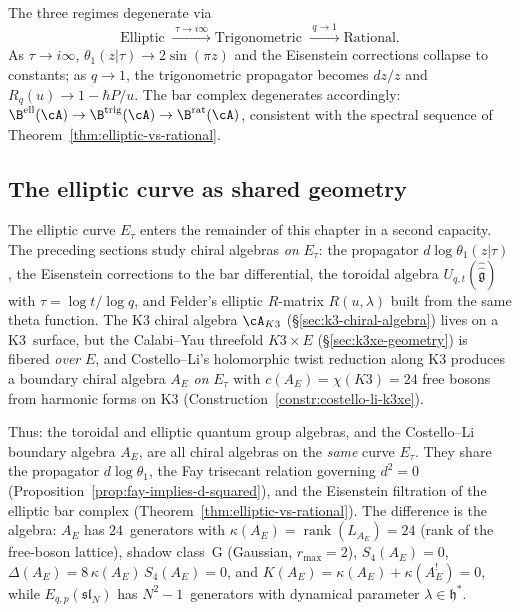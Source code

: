 \begin{remark}\label{rem:degeneration-limits}
The three regimes degenerate via
\begin{equation}\label{eq:degeneration-chain}
\text{Elliptic} \;\xrightarrow{\;\tau \to i\infty\;}
\text{Trigonometric} \;\xrightarrow{\;q \to 1\;}
\text{Rational}.
\end{equation}
As $\tau \to i\infty$, $\theta_1(z|\tau) \to 2\sin(\pi z)$ and the Eisenstein corrections collapse to constants; as $q \to 1$, the trigonometric propagator becomes $dz/z$ and $R_q(u) \to 1 - \hbar P/u$. The bar complex degenerates accordingly: $\B^{\mathrm{ell}}(\cA) \to \B^{\mathrm{trig}}(\cA) \to \B^{\mathrm{rat}}(\cA)$, consistent with the spectral sequence of Theorem~\ref{thm:elliptic-vs-rational}.
\end{remark}


\subsection{The elliptic curve as shared geometry}
\label{subsec:bridge-shared-E}

\begin{remark}
\label{rem:bridge-shared-E}
The elliptic curve $E_\tau$ enters the remainder of this chapter in a second
capacity. The preceding sections study chiral algebras \emph{on} $E_\tau$:
the propagator $d\log\theta_1(z|\tau)$, the Eisenstein corrections to
the bar differential, the toroidal algebra $U_{q,t}(\hat{\hat{\mathfrak{g}}})$
with $\tau = \log t / \log q$, and Felder's elliptic $R$-matrix
$R(u,\lambda)$ built from the same theta function.
The K3 chiral algebra $\cA_{K3}$ (\S\ref{sec:k3-chiral-algebra}) lives on a K3~surface, but
the Calabi--Yau threefold $K3 \times E$ (\S\ref{sec:k3xe-geometry}) is fibered
\emph{over} $E$, and Costello--Li's holomorphic twist reduction along K3
produces a boundary chiral algebra $A_E$ \emph{on} $E_\tau$ with
$c(A_E) = \chi(K3) = 24$ free bosons from harmonic forms on K3
(Construction~\ref{constr:costello-li-k3xe}).

Thus: the toroidal and elliptic quantum group algebras, and
the Costello--Li boundary algebra $A_E$, are all chiral
algebras on the \emph{same} curve $E_\tau$. They share the propagator
$d\log\theta_1$, the Fay trisecant relation governing $d^2 = 0$
(Proposition~\ref{prop:fay-implies-d-squared}), and the Eisenstein
filtration of the elliptic bar complex
(Theorem~\ref{thm:elliptic-vs-rational}).
The difference is the algebra: $A_E$ has $24$~generators
with $\kappa(A_E) = \operatorname{rank}(L_{A_E}) = 24$
(rank of the free-boson lattice), shadow class~G
(Gaussian, $r_{\max} = 2$), $S_4(A_E) = 0$,
$\Delta(A_E) = 8\,\kappa(A_E)\,S_4(A_E) = 0$, and
$K(A_E) = \kappa(A_E) + \kappa(A_E^!) = 0$, while
$E_{q,p}(\mathfrak{sl}_N)$ has $N^2 - 1$~generators with
dynamical parameter $\lambda \in \mathfrak{h}^*$.
\end{remark}


